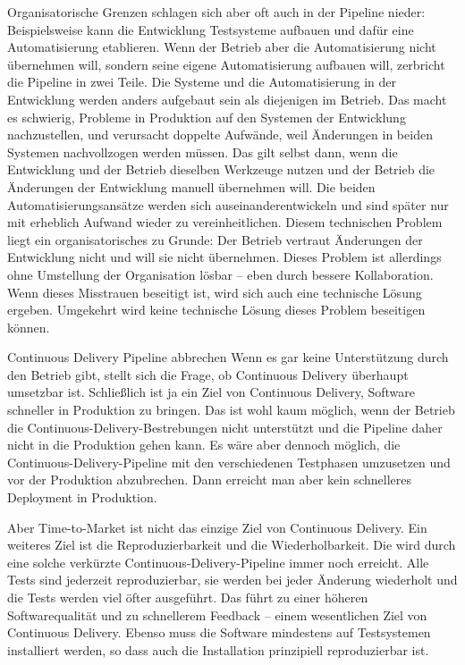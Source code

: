 Organisatorische Grenzen schlagen sich aber oft auch in der Pipeline nieder: Beispielsweise kann die Entwicklung Testsysteme aufbauen und dafür eine Automatisierung etablieren. Wenn der Betrieb aber die Automatisierung nicht übernehmen will, sondern seine eigene Automatisierung aufbauen will, zerbricht die Pipeline in zwei Teile. Die Systeme und die Automatisierung in der Entwicklung werden anders aufgebaut sein als diejenigen im Betrieb. Das macht es schwierig, Probleme in Produktion auf den Systemen der Entwicklung nachzustellen, und verursacht doppelte Aufwände, weil Änderungen in beiden Systemen nachvollzogen werden müssen. Das gilt selbst dann, wenn die Entwicklung und der Betrieb dieselben Werkzeuge nutzen und der Betrieb die Änderungen der Entwicklung manuell übernehmen will. Die beiden Automatisierungsansätze werden sich auseinanderentwickeln und sind später nur mit erheblich Aufwand wieder zu vereinheitlichen. Diesem technischen Problem liegt ein organisatorisches zu Grunde: Der Betrieb vertraut Änderungen der Entwicklung nicht und will sie nicht übernehmen. Dieses Problem ist allerdings ohne Umstellung der Organisation lösbar – eben durch bessere Kollaboration. Wenn dieses Misstrauen beseitigt ist, wird sich auch eine technische Lösung ergeben. Umgekehrt wird keine technische Lösung dieses Problem beseitigen können.

Continuous Delivery Pipeline abbrechen
Wenn es gar keine Unterstützung durch den Betrieb gibt, stellt sich die Frage, ob Continuous Delivery überhaupt umsetzbar ist. Schließlich ist ja ein Ziel von Continuous Delivery, Software schneller in Produktion zu bringen. Das ist wohl kaum möglich, wenn der Betrieb die Continuous-Delivery-Bestrebungen nicht unterstützt und die Pipeline daher nicht in die Produktion gehen kann. Es wäre aber dennoch möglich, die Continuous-Delivery-Pipeline mit den verschiedenen Testphasen umzusetzen und vor der Produktion abzubrechen. Dann erreicht man aber kein schnelleres Deployment in Produktion.

Aber Time-to-Market ist nicht das einzige Ziel von Continuous Delivery. Ein weiteres Ziel ist die Reproduzierbarkeit und die Wiederholbarkeit. Die wird durch eine solche verkürzte Continuous-Delivery-Pipeline immer noch erreicht. Alle Tests sind jederzeit reproduzierbar, sie werden bei jeder Änderung wiederholt und die Tests werden viel öfter ausgeführt. Das führt zu einer höheren Softwarequalität und zu schnellerem Feedback – einem wesentlichen Ziel von Continuous Delivery. Ebenso muss die Software mindestens auf Testsystemen installiert werden, so dass auch die Installation prinzipiell reproduzierbar ist.

